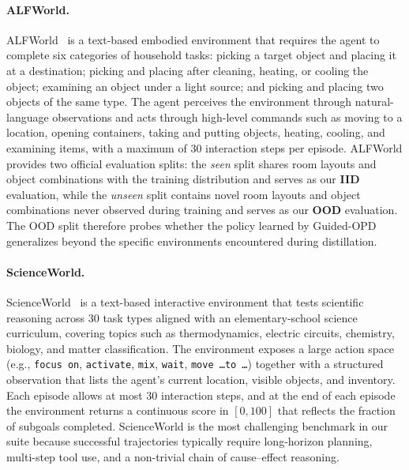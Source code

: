 \documentclass[11pt]{article}
\begin{document}
\paragraph{ALFWorld.}
ALFWorld~\citep{ALFWorld} is a text-based embodied environment that requires the agent to complete six categories of household tasks: picking a target object and placing it at a destination; picking and placing after cleaning, heating, or cooling the object; examining an object under a light source; and picking and placing two objects of the same type. The agent perceives the environment through natural-language observations and acts through high-level commands such as moving to a location, opening containers, taking and putting objects, heating, cooling, and examining items, with a maximum of $30$ interaction steps per episode. ALFWorld provides two official evaluation splits: the \emph{seen} split shares room layouts and object combinations with the training distribution and serves as our \textbf{IID} evaluation, while the \emph{unseen} split contains novel room layouts and object combinations never observed during training and serves as our \textbf{OOD} evaluation. The OOD split therefore probes whether the policy learned by Guided-OPD generalizes beyond the specific environments encountered during distillation.

\paragraph{ScienceWorld.}
ScienceWorld~\citep{ScienceWorld} is a text-based interactive environment that tests scientific reasoning across $30$ task types aligned with an elementary-school science curriculum, covering topics such as thermodynamics, electric circuits, chemistry, biology, and matter classification. The environment exposes a large action space (e.g., \texttt{focus on}, \texttt{activate}, \texttt{mix}, \texttt{wait}, \texttt{move \dots to \dots}) together with a structured observation that lists the agent's current location, visible objects, and inventory. Each episode allows at most $30$ interaction steps, and at the end of each episode the environment returns a continuous score in $[0, 100]$ that reflects the fraction of subgoals completed. ScienceWorld is the most challenging benchmark in our suite because successful trajectories typically require long-horizon planning, multi-step tool use, and a non-trivial chain of cause--effect reasoning.
\end{document}

